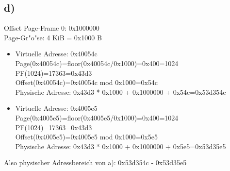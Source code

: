 \documentclass{ti2}
\begin{document}
\subsection*{d)}
Offset Page-Frame 0: 0x1000000
\\
Page-Gr"o"se: 4 KiB = 0x1000 B
\begin{itemize}
\item Virtuelle Adresse: 0x40054c 
\\
Page(0x40054c)=floor(0x40054c/0x1000)=0x400=1024
\\
PF(1024)=17363=0x43d3
\\
Offset(0x40054c)=0x40054c mod 0x1000=0x54c
\\
Physische Adresse: 0x43d3 * 0x1000 + 0x1000000 + 0x54c=0x53d354c
\item Virtuelle Adresse: 0x4005e5 
\\
Page(0x4005e5)=floor(0x4005e5/0x1000)=0x400=1024
\\
PF(1024)=17363=0x43d3
\\
Offset(0x4005e5)=0x4005e5 mod 0x1000=0x5e5
\\
Physische Adresse: 0x43d3 * 0x1000 + 0x1000000 + 0x5e5=0x53d35e5
\end{itemize}
Also physischer Adressbereich von a): 0x53d354c - 0x53d35e5
\end{document}
